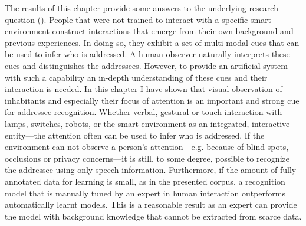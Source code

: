 The results of this chapter provide some answers to the underlying research question ().
People that were not trained to interact with a specific \gls{smart environment} construct interactions that emerge from their own background and previous experiences.
In doing so, they exhibit a set of multi-modal cues that can be used to infer who is addressed.
A human observer naturally interprets these cues and distinguishes the \glspl{addressee}.
However, to provide an artificial system with such a capability an in-depth understanding of these cues and their interaction is needed.
In this chapter I have shown that visual observation of inhabitants and especially their focus of attention is an important and strong cue for \gls{addressee} recognition.
Whether verbal, gestural or touch interaction with lamps, switches, \glspl{robot}, or the \gls{smart environment} as an integrated, \gls{interactive entity}---the attention often can be used to infer who is addressed.
If the environment can not observe a person's attention---e.g. because of blind spots, occlusions or privacy concerns---it is still, to some degree, possible to recognize the \gls{addressee} using only speech information.
Furthermore, if the amount of fully annotated data for learning is small, as in the presented corpus, a recognition model that is manually tuned by an expert in human interaction outperforms automatically learnt models.
This is a reasonable result as an expert can provide the model with background knowledge that cannot be extracted from scarce data.

